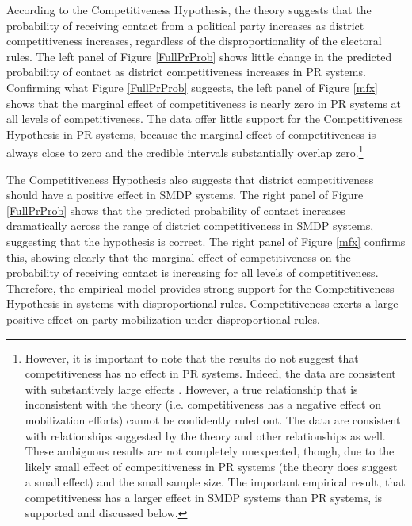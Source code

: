 \documentclass[12pt]{article}
\begin{document}
According to the Competitiveness Hypothesis, the theory suggests that the probability of receiving contact from a political party increases as district competitiveness increases, regardless of the disproportionality of the electoral rules. The left panel of Figure \ref{FullPrProb} shows little change in the predicted probability of contact as district competitiveness increases in PR systems. Confirming what Figure \ref{FullPrProb} suggests, the left panel of Figure \ref{mfx} shows that the marginal effect of competitiveness is nearly zero in PR systems at all levels of competitiveness. The data offer little support for the Competitiveness Hypothesis in PR systems, because the marginal effect of competitiveness is always close to zero and the credible intervals substantially overlap zero.\footnote{\label{fn:noeffect}However, it is important to note that the results do not suggest that competitiveness has no effect in PR systems. Indeed, the data are consistent with substantively large effects \citep{Rainey2014}. However, a true relationship that is inconsistent with the theory (i.e. competitiveness has a negative effect on mobilization efforts) cannot be confidently ruled out. The data are consistent with relationships suggested by the theory and other relationships as well. These ambiguous results are not completely unexpected, though, due to the likely small effect of competitiveness in PR systems (the theory does suggest a small effect) and the small sample size. The important empirical result, that competitiveness has a larger effect in SMDP systems than PR systems, is supported and discussed below.}

The Competitiveness Hypothesis also suggests that district competitiveness should have a positive effect in SMDP systems. The right panel of Figure \ref{FullPrProb} shows that the predicted probability of contact increases dramatically across the range of district competitiveness in SMDP systems, suggesting that the hypothesis is correct. The right panel of Figure \ref{mfx} confirms this, showing clearly that the marginal effect of competitiveness on the probability of receiving contact is increasing for all levels of competitiveness. Therefore, the empirical model provides strong support for the Competitiveness Hypothesis in systems with disproportional rules. Competitiveness exerts a large positive effect on party mobilization under disproportional rules.
\end{document}
